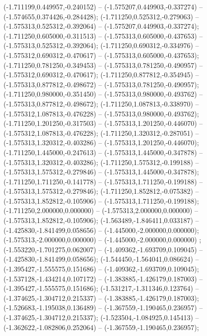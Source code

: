  (-1.711199,0.449957,-0.240152) -- (-1.575207,0.449903,-0.337274) -- (-1.574655,0.374426,-0.284428);
 (-1.711250,0.525312,-0.279063) -- (-1.575313,0.525312,-0.392064) -- (-1.575207,0.449903,-0.337274);
 (-1.711250,0.605000,-0.311513) -- (-1.575313,0.605000,-0.437653) -- (-1.575313,0.525312,-0.392064);
 (-1.711250,0.690312,-0.334976) -- (-1.575312,0.690312,-0.470617) -- (-1.575313,0.605000,-0.437653);
 (-1.711250,0.781250,-0.349453) -- (-1.575313,0.781250,-0.490957) -- (-1.575312,0.690312,-0.470617);
 (-1.711250,0.877812,-0.354945) -- (-1.575313,0.877812,-0.498672) -- (-1.575313,0.781250,-0.490957);
 (-1.711250,0.980000,-0.351450) -- (-1.575313,0.980000,-0.493762) -- (-1.575313,0.877812,-0.498672);
 (-1.711250,1.087813,-0.338970) -- (-1.575312,1.087813,-0.476228) -- (-1.575313,0.980000,-0.493762);
 (-1.711250,1.201250,-0.317503) -- (-1.575313,1.201250,-0.446070) -- (-1.575312,1.087813,-0.476228);
 (-1.711250,1.320312,-0.287051) -- (-1.575313,1.320312,-0.403286) -- (-1.575313,1.201250,-0.446070);
 (-1.711250,1.445000,-0.247613) -- (-1.575313,1.445000,-0.347878) -- (-1.575313,1.320312,-0.403286);
 (-1.711250,1.575312,-0.199188) -- (-1.575313,1.575312,-0.279846) -- (-1.575313,1.445000,-0.347878);
 (-1.711250,1.711250,-0.141778) -- (-1.575313,1.711250,-0.199188) -- (-1.575313,1.575312,-0.279846);
 (-1.711250,1.852812,-0.075382) -- (-1.575313,1.852812,-0.105906) -- (-1.575313,1.711250,-0.199188);
 (-1.711250,2.000000,0.000000) -- (-1.575313,2.000000,0.000000) -- (-1.575313,1.852812,-0.105906);
 (-1.563489,-1.846411,0.033187) -- (-1.425830,-1.841499,0.058656) -- (-1.445000,-2.000000,0.000000);
 (-1.575313,-2.000000,0.000000) -- (-1.445000,-2.000000,0.000000) ;
 (-1.553220,-1.701275,0.062007) -- (-1.409362,-1.693709,0.109045) -- (-1.425830,-1.841499,0.058656);
 (-1.544450,-1.564041,0.086624) -- (-1.395427,-1.555575,0.151686) -- (-1.409362,-1.693709,0.109045);
 (-1.537128,-1.434214,0.107172) -- (-1.383885,-1.426179,0.187003) -- (-1.395427,-1.555575,0.151686);
 (-1.531217,-1.311346,0.123764) -- (-1.374625,-1.304712,0.215337) -- (-1.383885,-1.426179,0.187003);
 (-1.526683,-1.195038,0.136489) -- (-1.367559,-1.190465,0.236957) -- (-1.374625,-1.304712,0.215337);
 (-1.523504,-1.084925,0.145413) -- (-1.362622,-1.082806,0.252064) -- (-1.367559,-1.190465,0.236957);
